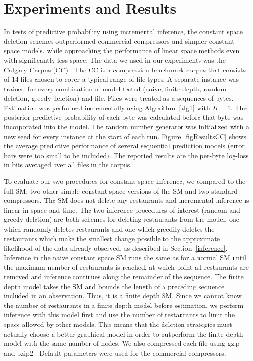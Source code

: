 \section{Experiments and Results}
\label{results}

In tests of predictive probability using incremental inference, the constant space deletion schemes outperformed commercial compressors and simpler constant space models, while approaching the performance of linear space methods even with significantly less space.  The data we used in our experiments was the Calgary Corpus (CC) \cite{Bell1989}.  The CC is a compression benchmark corpus that consists of 14 files chosen to cover a typical range of file types.  A separate instance was trained for every combination of model tested (naive, finite depth, random deletion, greedy deletion) and file.  Files were treated as a sequences of bytes.  Estimation was performed incrementally using Algorithm~\ref{alg1} with $K=1$. The posterior predictive probability of each byte was calculated before that byte was incorporated into the model.  The random number generator was initialized with a new seed for every instance at the start of each run.  Figure~\ref{figResultsCC} shows the average predictive performance of several sequential prediction models (error bars were too small to be included).  The reported results are the per-byte log-loss in bits averaged over all files in the corpus.  

To evaluate our two procedures for constant space inference, we compared to the full SM, two other simple constant space versions of the SM and two standard compressors.  The SM does not delete any restaurants and incremental inference is linear in space and time.  The two inference procedures of interest (random and greedy deletion) are both schemes for deleting restaurants from the model, one which randomly deletes restaurants and one which greedily deletes the restaurants which make the smallest change possible to the approximate likelihood of the data already observed, as described in Section~\ref{inference}.  Inference in the naive constant space SM runs the same as for a normal SM until the maximum number of restaurants is reached, at which point all restaurants are removed and inference continues along the remainder of the sequence.  The finite depth model takes the SM and bounds the length of a preceding sequence included in an observation.  Thus, it is a finite depth SM. Since we cannot know the number of restaurants in a finite depth model before estimation, we perform inference with this model first and use the number of restaurants to limit the space allowed by other models. This means that the deletion strategies must actually choose a better graphical model in order to outperform the finite depth model with the same number of nodes. We also compressed each file using gzip and bzip2 \cite{Deutsch1996, Seward1999}.  Default parameters were used for the commercial compressors.

